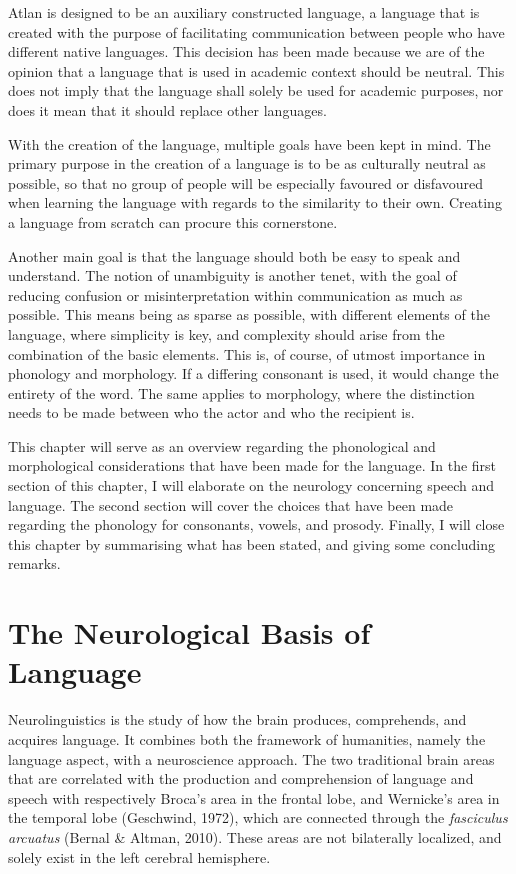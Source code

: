 Atlan is designed to be an auxiliary constructed language, a language that is created with the purpose of facilitating communication between people who have different native languages. This decision has been made because we are of the opinion that a language that is used in academic context should be neutral. This does not imply that the language shall solely be used for academic purposes, nor does it mean that it should replace other languages. 

With the creation of the language, multiple goals have been kept in mind. The primary purpose in the creation of a language is to be as culturally neutral as possible, so that no group of people will be especially favoured or disfavoured when learning the language with regards to the similarity to their own. Creating a language from scratch can procure this cornerstone. 

Another main goal is that the language should both be easy to speak and understand. The notion of unambiguity is another tenet, with the goal of reducing confusion or misinterpretation within communication as much as possible. This means being as sparse as possible, with different elements of the language, where simplicity is key, and complexity should arise from the combination of the basic elements. This is, of course, of utmost importance in phonology and morphology. If a differing consonant is used, it would change the entirety of the word. The same applies to morphology, where the distinction needs to be made between who the actor and who the recipient is. 

This chapter will serve as an overview regarding the phonological and morphological considerations that have been made for the language. In the first section of this chapter, I will elaborate on the neurology concerning speech and language. The second section will cover the choices that have been made regarding the phonology for consonants, vowels, and prosody. Finally, I will close this chapter by summarising what has been stated, and giving some concluding remarks.

\vfill

\section{The Neurological Basis of Language}

Neurolinguistics is the study of how the brain produces, comprehends, and acquires language. 
It combines both the framework of humanities, namely the language aspect, with a neuroscience approach. The two traditional brain areas that are correlated with the production and comprehension of language and speech with respectively Broca’s area in the frontal lobe, and Wernicke’s area in the temporal lobe (Geschwind, 1972), which are connected through the \textit{fasciculus arcuatus} (Bernal \& Altman, 2010). These areas are not bilaterally localized, and solely exist in the left cerebral hemisphere. 

